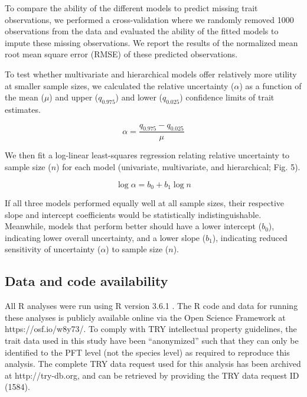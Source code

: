 \documentclass{article}
\begin{document}
To compare the ability of the different models to predict missing trait observations,
we performed a cross-validation where we randomly removed 1000 observations from the data
and evaluated the ability of the fitted models to impute these missing observations.
We report the results of the normalized mean root mean square error (RMSE) of these predicted observations.

To test whether multivariate and hierarchical models offer relatively more utility at smaller sample sizes,
we calculated the relative uncertainty ($\alpha$) as a function of the mean ($\mu$) and upper ($q_{0.975}$) and lower ($q_{0.025}$) confidence limits of trait estimates.

\begin{equation}
\alpha = \frac{q_{0.975} - q_{0.025}}{\mu}
\end{equation}

We then fit a log-linear least-squares regression relating relative uncertainty to sample size ($n$) for each model (univariate, multivariate, and hierarchical; Fig. 5).

\begin{equation}
\log{\alpha} = b_0 + b_1 \log{n}
\end{equation}

If all three models performed equally well at all sample sizes, their respective slope and intercept coefficients would be statistically indistinguishable.
Meanwhile, models that perform better should have
a lower intercept ($b_0$), indicating lower overall uncertainty,
and
a lower slope ($b_1$), indicating reduced sensitivity of uncertainty ($\alpha$) to sample size ($n$).

\subsection{Data and code availability}

All R analyses were run using R version 3.6.1 \citep{r_361}.
The R code and data for running these analyses is publicly available online via the Open Science Framework at https://osf.io/w8y73/.
To comply with TRY intellectual property guidelines, the trait data used in this study have been ``anonymized'' such that they can only be identified to the PFT level (not the species level) as required to reproduce this analysis.
The complete TRY data request used for this analysis has been archived at http://try-db.org, and can be retrieved by providing the TRY data request ID (1584).
\end{document}
